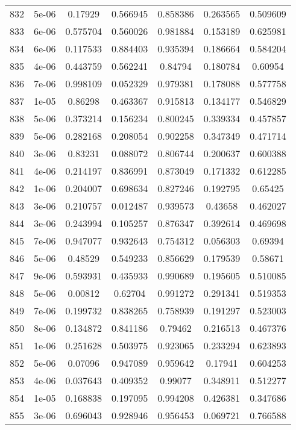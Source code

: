 \begin{table}
\begin{tabular*}{\linewidth}{c|c|c|c|c|c|c}
832 & 5e-06 & 0.17929 & 0.566945 & 0.858386 & 0.263565 & 0.509609\\
833 & 6e-06 & 0.575704 & 0.560026 & 0.981884 & 0.153189 & 0.625981\\
834 & 6e-06 & 0.117533 & 0.884403 & 0.935394 & 0.186664 & 0.584204\\
835 & 4e-06 & 0.443759 & 0.562241 & 0.84794 & 0.180784 & 0.60954\\
836 & 7e-06 & 0.998109 & 0.052329 & 0.979381 & 0.178088 & 0.577758\\
837 & 1e-05 & 0.86298 & 0.463367 & 0.915813 & 0.134177 & 0.546829\\
838 & 5e-06 & 0.373214 & 0.156234 & 0.800245 & 0.339334 & 0.457857\\
839 & 5e-06 & 0.282168 & 0.208054 & 0.902258 & 0.347349 & 0.471714\\
840 & 3e-06 & 0.83231 & 0.088072 & 0.806744 & 0.200637 & 0.600388\\
841 & 4e-06 & 0.214197 & 0.836991 & 0.873049 & 0.171332 & 0.612285\\
842 & 1e-06 & 0.204007 & 0.698634 & 0.827246 & 0.192795 & 0.65425\\
843 & 3e-06 & 0.210757 & 0.012487 & 0.939573 & 0.43658 & 0.462027\\
844 & 3e-06 & 0.243994 & 0.105257 & 0.876347 & 0.392614 & 0.469698\\
845 & 7e-06 & 0.947077 & 0.932643 & 0.754312 & 0.056303 & 0.69394\\
846 & 5e-06 & 0.48529 & 0.549233 & 0.856629 & 0.179539 & 0.58671\\
847 & 9e-06 & 0.593931 & 0.435933 & 0.990689 & 0.195605 & 0.510085\\
848 & 5e-06 & 0.00812 & 0.62704 & 0.991272 & 0.291341 & 0.519353\\
849 & 7e-06 & 0.199732 & 0.838265 & 0.758939 & 0.191297 & 0.523003\\
850 & 8e-06 & 0.134872 & 0.841186 & 0.79462 & 0.216513 & 0.467376\\
851 & 1e-06 & 0.251628 & 0.503975 & 0.923065 & 0.233294 & 0.623893\\
852 & 5e-06 & 0.07096 & 0.947089 & 0.959642 & 0.17941 & 0.604253\\
853 & 4e-06 & 0.037643 & 0.409352 & 0.99077 & 0.348911 & 0.512277\\
854 & 1e-05 & 0.168838 & 0.197095 & 0.994208 & 0.426381 & 0.347686\\
855 & 3e-06 & 0.696043 & 0.928946 & 0.956453 & 0.069721 & 0.766588\\
\end{tabular*}
\end{table}
